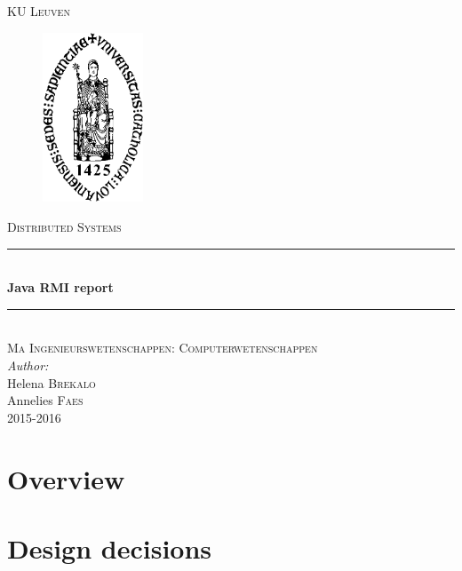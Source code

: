 \documentclass[10pt,a4paper]{article}
\author{Helena Brekalo and Annelies Faes}
\begin{document}
\begin{titlepage}

\newcommand{\HRule}{\rule{\linewidth}{0.5mm}} %

\center %
 
\textsc{\LARGE KU Leuven}\\[1.5cm] %


\begin{figure}[ht!]
\centering
\includegraphics[width=30mm]{logo_theo.png}
\label{kulogo}
\end{figure}

\textsc{\Large Distributed Systems}\\[0.5cm] %


\HRule \\[0.4cm]
{ \huge \bfseries Java RMI report}\\[0.4cm]
\HRule \\[1.5cm]


\textsc{\large Ma Ingenieurswetenschappen: Computerwetenschappen}\\[0.5cm] %


\Large \emph{Author:}\\
Helena \textsc{Brekalo}\\
Annelies \textsc{Faes}\\[2cm]


{\large 2015-2016}\\[3cm] %

\vfill %

\end{titlepage}
\clearpage

\section{Overview}

\section{Design decisions}
\end{document}
